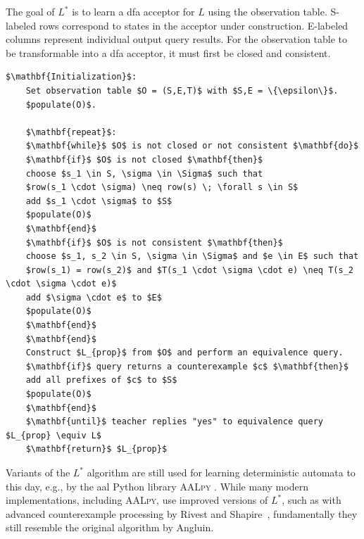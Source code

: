 The goal of $L^*$ is to learn a \ac{dfa} acceptor for $L$ using the observation table. S-labeled rows correspond to states in the acceptor under construction. E-labeled columns represent individual output query results. For the observation table to be transformable into a \ac{dfa} acceptor, it must first be closed and consistent.

\begin{lstlisting}[mathescape=true, float=b, caption=$L^*$ algorithm, label=lst:lstar]
	$\mathbf{Initialization}$: 
	Set observation table $O = (S,E,T)$ with $S,E = \{\epsilon\}$.
	$populate(O)$.
	
	$\mathbf{repeat}$:
	$\mathbf{while}$ $O$ is not closed or not consistent $\mathbf{do}$
	$\mathbf{if}$ $O$ is not closed $\mathbf{then}$
	choose $s_1 \in S, \sigma \in \Sigma$ such that
	$row(s_1 \cdot \sigma) \neq row(s) \; \forall s \in S$
	add $s_1 \cdot \sigma$ to $S$
	$populate(O)$
	$\mathbf{end}$
	$\mathbf{if}$ $O$ is not consistent $\mathbf{then}$
	choose $s_1, s_2 \in S, \sigma \in \Sigma$ and $e \in E$ such that
	$row(s_1) = row(s_2)$ and $T(s_1 \cdot \sigma \cdot e) \neq T(s_2 \cdot \sigma \cdot e)$
	add $\sigma \cdot e$ to $E$
	$populate(O)$
	$\mathbf{end}$		
	$\mathbf{end}$
	Construct $L_{prop}$ from $O$ and perform an equivalence query.	
	$\mathbf{if}$ query returns a counterexample $c$ $\mathbf{then}$
	add all prefixes of $c$ to $S$
	$populate(O)$
	$\mathbf{end}$
	$\mathbf{until}$ teacher replies "yes" to equivalence query $L_{prop} \equiv L$
	$\mathbf{return}$ $L_{prop}$
\end{lstlisting}
\fi

Variants of the $L^*$ algorithm are still used for learning deterministic automata to this day, e.g., by the \ac{aal} Python library \textsc{AALpy} \cite{software:aalpy}. While many modern implementations, including \textsc{AALpy}, use improved versions of $L^*$, such as with advanced counterexample processing by Rivest and Shapire~\cite{Rivest1993Inference}, fundamentally they still resemble the original algorithm by Angluin. 

 
